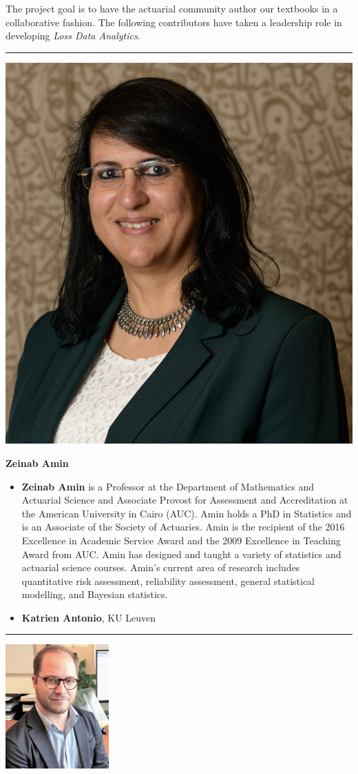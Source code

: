 \documentclass[
  12pt,
  krantz2]{Format/krantzNoCorner}
\begin{document}
The project goal is to have the actuarial community author our textbooks in a collaborative fashion. The following contributors have taken a leadership role in developing \emph{Loss Data Analytics}.

\begin{center}\rule{0.5\linewidth}{0.5pt}\end{center}

\begin{center}\includegraphics[width=0.2\linewidth,height=0.3\textheight]{ContributorPics/ZeinabAmin} \end{center}

\begin{center}
\textbf{ Zeinab Amin }
\end{center}

\begin{itemize}
\item
  \textbf{Zeinab Amin} is a Professor at the Department of Mathematics and Actuarial Science and Associate Provost for Assessment and Accreditation at the American University in Cairo (AUC). Amin holds a PhD in Statistics and is an Associate of the Society of Actuaries. Amin is the recipient of the 2016 Excellence in Academic Service Award and the 2009 Excellence in Teaching Award from AUC. Amin has designed and taught a variety of statistics and actuarial science courses. Amin's current area of research includes quantitative risk assessment, reliability assessment, general statistical modelling, and Bayesian statistics.
\item
  \textbf{Katrien Antonio}, KU Leuven
\end{itemize}

\begin{center}\rule{0.5\linewidth}{0.5pt}\end{center}

\newpage

\begin{center}\includegraphics[width=0.2\linewidth,height=0.3\textheight]{ContributorPics/JFBegin} \end{center}
\end{document}

